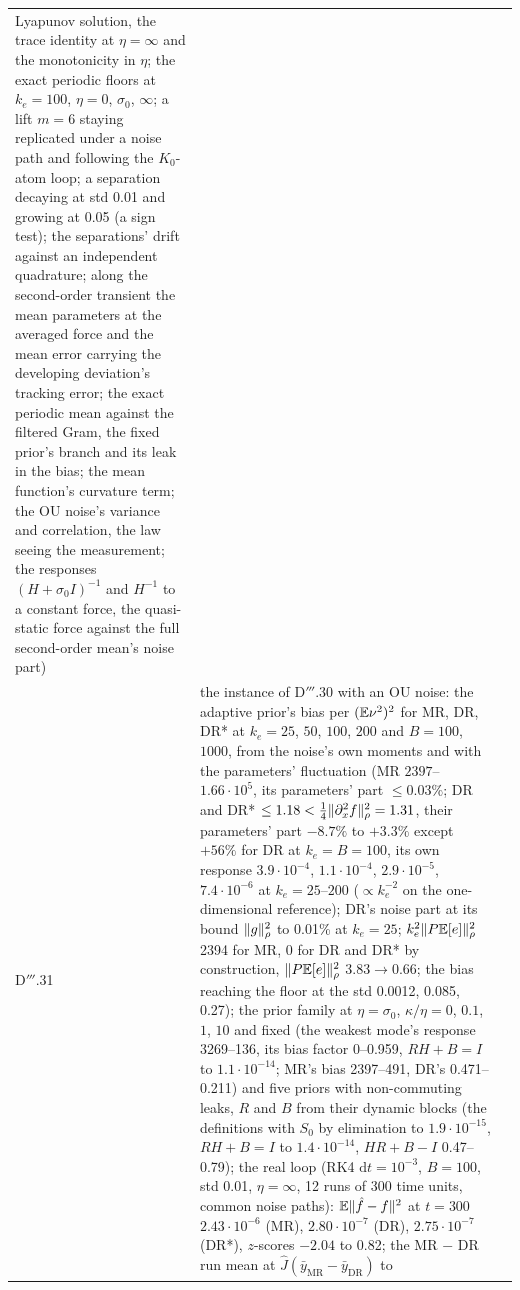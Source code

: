 {\begin{longtable}{@{}>{\raggedright\arraybackslash}p{}>{\raggedright\arraybackslash}p{}%
>{\raggedright\arraybackslash}p{}@{}}
    Lyapunov solution, the trace identity at $\eta = \infty$ and the monotonicity in $\eta$; the exact periodic floors
    at $k_e = 100$, $\eta = 0$, $\sigma_0$, $\infty$; a lift $m = 6$ staying replicated under a noise path and
    following the $K_0$-atom loop; a separation decaying at std 0.01 and growing at 0.05 (a sign test); the
    separations' drift against an independent quadrature; along the second-order transient the mean parameters at the
    averaged force and the mean error carrying the developing deviation's tracking error; the exact periodic mean
    against the filtered Gram, the fixed prior's branch and its leak in the bias; the mean function's curvature term;
    the OU noise's variance and correlation, the law seeing the measurement; the responses $(H + \sigma_0I)^{-1}$ and
    $H^{-1}$ to a constant force, the quasi-static force against the full second-order mean's noise part)\\
D$'''$.31 & the instance of D$'''$.30 with an OU noise: the adaptive prior's bias per $(\mathbb{E}\nu^2)^2$ for MR, DR, DR*
  at $k_e = 25$, $50$, $100$, $200$ and $B = 100$, $1000$, from the noise's own moments and with the parameters'
  fluctuation (MR $2397$--$1.66\cdot10^5$, its parameters' part $\le0.03\%$; DR and DR* $\le1.18 <
  \frac14\lVert \partial^2_xf\rVert^2_\rho = 1.31$, their parameters' part $-8.7\%$ to $+3.3\%$ except $+56\%$ for DR at
  $k_e = B = 100$, its own response $3.9\cdot10^{-4}$, $1.1\cdot10^{-4}$, $2.9\cdot10^{-5}$, $7.4\cdot10^{-6}$ at
  $k_e = 25$--$200$ ($\propto k_e^{-2}$ on the one-dimensional reference); DR's noise part at its bound
  $\lVert g\rVert^2_\rho$ to 0.01\% at $k_e = 25$; $k_e^2\lVert P\mathbb{E}[e]\rVert^2_\rho$ 2394 for MR, 0 for DR and DR* by
  construction, $\lVert P\mathbb{E}[e]\rVert^2_\rho$ $3.83\to0.66$; the bias reaching the floor at the std 0.0012, 0.085, 0.27); the
  prior family at $\eta = \sigma_0$, $\kappa/\eta = 0$, $0.1$, $1$, $10$ and fixed (the weakest mode's response
  3269--136, its bias factor 0--0.959, $RH + B = I$ to $1.1\cdot10^{-14}$; MR's bias 2397--491, DR's 0.471--0.211)
  and five priors with non-commuting leaks, $R$ and $B$ from their dynamic blocks (the definitions with $S_0$ by
  elimination to $1.9\cdot10^{-15}$, $RH + B = I$ to $1.4\cdot10^{-14}$, $HR + B - I$ 0.47--0.79); the real loop (RK4
  $\mathrm{d}t = 10^{-3}$, $B = 100$, std 0.01, $\eta = \infty$, 12 runs of 300 time units, common noise paths):
  $\mathbb{E}\lVert \hat f - f\rVert^2$ at $t = 300$ $2.43\cdot10^{-6}$ (MR), $2.80\cdot10^{-7}$ (DR), $2.75\cdot10^{-7}$ (DR*),
  $z$-scores $-2.04$ to 0.82; the MR $-$ DR run mean at $\hat J(\bar y_{\mathrm{MR}} - \bar y_{\mathrm{DR}})$ to

\end{longtable}}
